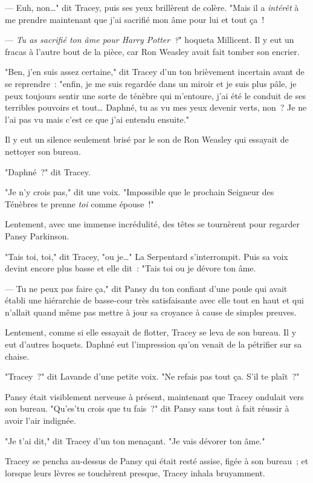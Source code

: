 --- Euh, non…" dit Tracey, puis ses yeux brillèrent de colère. "Mais il a \emph{intérêt} à me prendre maintenant que j'ai sacrifié mon âme pour lui et tout ça~!

--- \emph{Tu as sacrifié ton âme pour Harry Potter~?}" hoqueta Millicent. Il y eut un fracas à l'autre bout de la pièce, car Ron Weasley avait fait tomber son encrier.

"Ben, j'en suis assez certaine," dit Tracey d'un ton brièvement incertain avant de se reprendre~: "enfin, je me suis regardée dans un miroir et je suis plus pâle, je peux toujours sentir une sorte de ténèbre qui m'entoure, j'ai été le conduit de ses terribles pouvoirs et tout… Daphné, tu as vu mes yeux devenir verts, non~? Je ne l'ai pas vu mais c'est ce que j'ai entendu ensuite."

Il y eut un silence seulement brisé par le son de Ron Weasley qui essayait de nettoyer son bureau.

"Daphné~?" dit Tracey.

"Je n'y crois pas," dit une voix. "Impossible que le prochain Seigneur des Ténèbres te prenne \emph{toi} comme épouse~!"

Lentement, avec une immense incrédulité, des têtes se tournèrent pour regarder Pansy Parkinson.

"Tais toi, toi," dit Tracey, "ou je…" La Serpentard s'interrompit. Puis sa voix devint encore plus basse et elle dit~: "Tais toi ou je dévore ton âme.

--- Tu ne peux pas faire ça," dit Pansy du ton confiant d'une poule qui avait établi une hiérarchie de basse-cour très satisfaisante avec elle tout en haut et qui n'allait quand même pas mettre à jour sa croyance à cause de simples preuves.

Lentement, comme si elle essayait de flotter, Tracey se leva de son bureau. Il y eut d'autres hoquets. Daphné eut l'impression qu'on venait de la pétrifier sur sa chaise.

"Tracey~?" dit Lavande d'une petite voix. "Ne refais pas tout ça. S'il te plaît~?"

Pansy était visiblement nerveuse à présent, maintenant que Tracey ondulait vers son bureau. "Qu'es'tu crois que tu fais~?" dit Pansy sans tout à fait réussir à avoir l'air indignée.

"Je t'ai dit," dit Tracey d'un ton menaçant. "Je vais dévorer ton âme."

Tracey se pencha au-dessus de Pansy qui était resté assise, figée à son bureau~; et lorsque leurs lèvres se touchèrent presque, Tracey inhala bruyamment.

